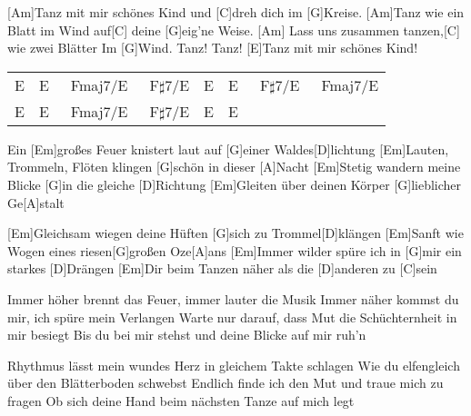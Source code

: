 


\begin{guitar}
	\begin{highlightbar}
		 
		[Am]Tanz mit mir schönes Kind und [C]dreh dich im [G]Kreise.
		[Am]Tanz wie ein Blatt im Wind auf[C] deine [G]eig'ne Weise.
		[Am] Lass uns zusammen tanzen,[C] wie zwei Blätter
		Im [G]Wind. Tanz! Tanz! [E]Tanz mit mir schönes Kind!
	\end{highlightbar}
	
	\songsection{Instrumental}
	{\footnotesize\begin{tabular}{|l|l|l|l|}
			E & E~~~Fmaj7/E~~~F$\sharp$7/E & E & E~~~F$\sharp$7/E~~~Fmaj7/E \\
			E & E~~~Fmaj7/E~~~F$\sharp$7/E & E & E 
	\end{tabular}}
	
	\songsection{Strophe 1}
	Ein [Em]großes Feuer knistert laut auf [G]einer Waldes[D]lichtung
	[Em]Lauten, Trommeln, Flöten klingen [G]schön in dieser [A]Nacht
	[Em]Stetig wandern meine Blicke [G]in die gleiche [D]Richtung
	[Em]Gleiten über deinen Körper [G]lieblicher Ge[A]stalt
	
	[Em]Gleichsam wiegen deine Hüften [G]sich zu Trommel[D]klängen
	[Em]Sanft wie Wogen eines riesen[G]großen Oze[A]ans
	[Em]Immer wilder spüre ich in [G]mir ein starkes [D]Drängen
	[Em]Dir beim Tanzen näher als die [D]anderen zu [C]sein
	
	\begin{highlightbar}
		  \optionalChord{(x2)}
	\end{highlightbar}
	
	 
	
	Immer höher brennt das Feuer, immer lauter die Musik
	Immer näher kommst du mir, ich spüre mein Verlangen
	Warte nur darauf, dass Mut die Schüchternheit in mir besiegt
	Bis du bei mir stehst und deine Blicke auf mir ruh'n
	
	Rhythmus lässt mein wundes Herz in gleichem Takte schlagen
	Wie du elfengleich über den Blätterboden schwebst
	Endlich finde ich den Mut und traue mich zu fragen
	Ob sich deine Hand beim nächsten Tanze auf mich legt
	

\end{guitar}
